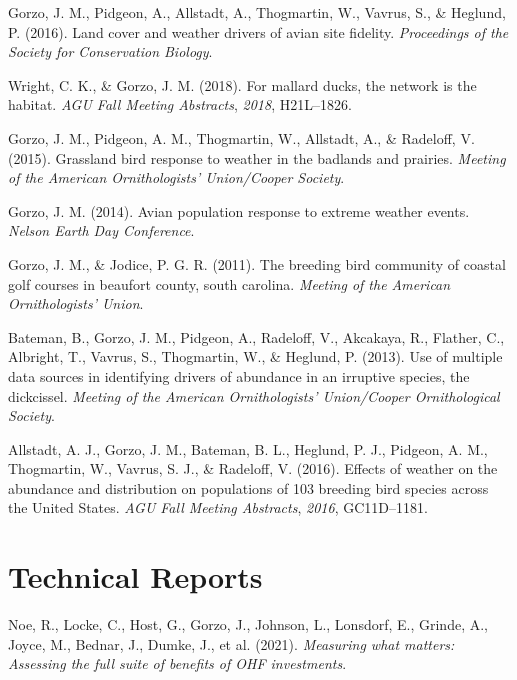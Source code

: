 \documentclass[11pt,a4paper,]{awesome-cv}
\begin{document}
\leavevmode{}%
Gorzo, J. M., Pidgeon, A., Allstadt, A., Thogmartin, W., Vavrus, S., \&
Heglund, P. (2016). Land cover and weather drivers of avian site
fidelity. \emph{Proceedings of the Society for Conservation Biology}.

\leavevmode{}%
Wright, C. K., \& Gorzo, J. M. (2018). For mallard ducks, the network is
the habitat. \emph{AGU Fall Meeting Abstracts}, \emph{2018}, H21L--1826.

\leavevmode{}%
Gorzo, J. M., Pidgeon, A. M., Thogmartin, W., Allstadt, A., \& Radeloff,
V. (2015). Grassland bird response to weather in the badlands and
prairies. \emph{Meeting of the American Ornithologists' Union/Cooper
Society}.

\leavevmode{}%
Gorzo, J. M. (2014). Avian population response to extreme weather
events. \emph{Nelson Earth Day Conference}.

\leavevmode{}%
Gorzo, J. M., \& Jodice, P. G. R. (2011). The breeding bird community of
coastal golf courses in beaufort county, south carolina. \emph{Meeting
of the American Ornithologists' Union}.

\leavevmode{}%
Bateman, B., Gorzo, J. M., Pidgeon, A., Radeloff, V., Akcakaya, R.,
Flather, C., Albright, T., Vavrus, S., Thogmartin, W., \& Heglund, P.
(2013). Use of multiple data sources in identifying drivers of abundance
in an irruptive species, the dickcissel. \emph{Meeting of the American
Ornithologists' Union/Cooper Ornithological Society}.

\leavevmode{}%
Allstadt, A. J., Gorzo, J. M., Bateman, B. L., Heglund, P. J., Pidgeon,
A. M., Thogmartin, W., Vavrus, S. J., \& Radeloff, V. (2016). Effects of
weather on the abundance and distribution on populations of 103 breeding
bird species across the United States. \emph{AGU Fall Meeting
Abstracts}, \emph{2016}, GC11D--1181.

\hypertarget{technical-reports}{%
\section{Technical Reports}\label{technical-reports}}

\hypertarget{bibliography}{}
\leavevmode{}%
Noe, R., Locke, C., Host, G., Gorzo, J., Johnson, L., Lonsdorf, E.,
Grinde, A., Joyce, M., Bednar, J., Dumke, J., et al. (2021).
\emph{Measuring what matters: Assessing the full suite of benefits of
OHF investments}.
\end{document}
